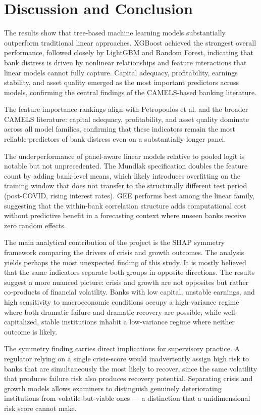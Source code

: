 \documentclass[conference]{IEEEtran}
\begin{document}
\section{Discussion and Conclusion}
The results show that tree-based machine learning models substantially outperform traditional linear approaches. XGBoost achieved the strongest overall performance, followed closely by LightGBM and Random Forest, indicating that bank distress is driven by nonlinear relationships and feature interactions that linear models cannot fully capture. Capital adequacy, profitability, earnings stability, and asset quality emerged as the most important predictors across models, confirming the central findings of the CAMELS-based banking literature.

The feature importance rankings align with Petropoulos et al. \cite{b4} and the broader CAMELS literature: capital adequacy, profitability, and asset quality dominate across all model families, confirming that these indicators remain the most reliable predictors of bank distress even on a substantially longer panel.

The underperformance of panel-aware linear models relative to pooled logit is notable but not unprecedented. The Mundlak specification doubles the feature count by adding bank-level means, which likely introduces overfitting on the training window that does not transfer to the structurally different test period (post-COVID, rising interest rates). GEE performs best among the linear family, suggesting that the within-bank correlation structure adds computational cost without predictive benefit in a forecasting context where unseen banks receive zero random effects.

The main analytical contribution of the project is the SHAP symmetry framework comparing the drivers of crisis and growth outcomes. The analysis yields perhaps the most unexpected finding of this study. It is mostly believed that the same indicators separate both groups in opposite directions. The results suggest a more nuanced picture: crisis and growth are not opposites but rather co-products of financial volatility. Banks with low capital, unstable earnings, and high sensitivity to macroeconomic conditions occupy a high-variance regime where both dramatic failure and dramatic recovery are possible, while well-capitalized, stable institutions inhabit a low-variance regime where neither outcome is likely. 

The symmetry finding carries direct implications for supervisory practice. A regulator relying on a single crisis-score would inadvertently assign high risk to banks that are simultaneously the most likely to recover, since the same volatility that produces failure risk also produces recovery potential. Separating crisis and growth models allows examiners to distinguish genuinely deteriorating institutions from volatile-but-viable ones — a distinction that a unidimensional risk score cannot make.
\end{document}
